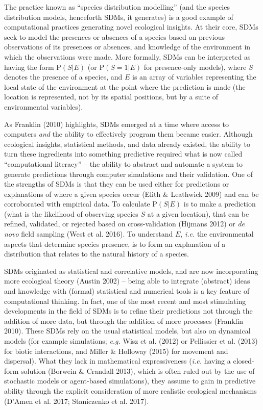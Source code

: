 \documentclass[12pt]{article}
\begin{document}
The practice known as \enquote{species distribution modelling} (and the
species distribution models, henceforth SDMs, it generates) is a good
example of computational practices generating novel ecological insights.
At their core, SDMs seek to model the presences or absences of a species
based on previous observations of its presences or absences, and
knowledge of the environment in which the observations were made. More
formally, SDMs can be interpreted as having the form \(\text{P}(S | E)\)
(or \(\text{P}(S=1 | E)\) for presence-only models), where \(S\) denotes
the presence of a species, and \(E\) is an array of variables
representing the local state of the environment at the point where the
prediction is made (the location is represented, not by its spatial
positions, but by a suite of environmental variables).

As Franklin (2010) highlights, SDMs emerged at a time where access to
computers \emph{and} the ability to effectively program them became
easier. Although ecological insights, statistical methods, and data
already existed, the ability to turn these ingredients into something
predictive required what is now called \enquote{computational literacy}
-- the ability to abstract and automate a system to generate predictions
through computer simulations and their validation. One of the strengths
of SDMs is that they can be used either for predictions or explanations
of where a given species occur (Elith \& Leathwick 2009) and can be
corroborated with empirical data. To calculate \(\text{P}(S | E)\) is to
make a prediction (what is the likelihood of observing species \(S\) at
a given location), that can be refined, validated, or rejected based on
cross-validation (Hijmans 2012) or \emph{de novo} field sampling (West
et al. 2016). To understand \(E\), \emph{i.e.} the environmental aspects
that determine species presence, is to form an explanation of a
distribution that relates to the natural history of a species.

SDMs originated as statistical and correlative models, and are now
incorporating more ecological theory (Austin 2002) -- being able to
integrate (abstract) ideas and knowledge with (formal) statistical and
numerical tools is a key feature of computational thinking. In fact, one
of the most recent and most stimulating developments in the field of
SDMs is to refine their predictions not through the addition of more
data, but through the addition of more processes (Franklin 2010). These
SDMs rely on the usual statistical models, but also on dynamical models
(for example simulations; \emph{e.g.} Wisz et al. (2012) or Pellissier
et al. (2013) for biotic interactions, and Miller \& Holloway (2015) for
movement and dispersal). What they lack in mathematical expressiveness
(\emph{i.e.} having a closed-form solution (Borwein \& Crandall 2013),
which is often ruled out by the use of stochastic models or agent-based
simulations), they assume to gain in predictive ability through the
explicit consideration of more realistic ecological mechanisms (D'Amen
et al. 2017; Staniczenko et al. 2017).
\end{document}
